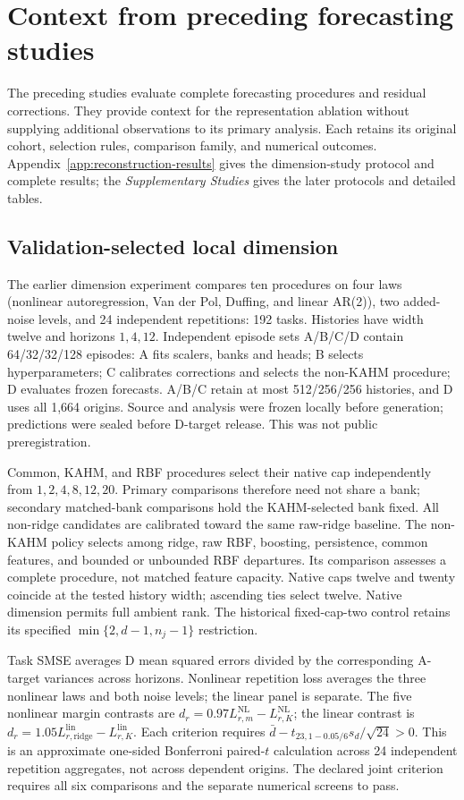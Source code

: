 \section{Context from preceding forecasting studies}
\label{sec:experiment}

The preceding studies evaluate complete forecasting procedures and
residual corrections. They provide context for the representation
ablation without supplying additional observations to its primary
analysis. Each retains its original cohort, selection rules, comparison
family, and numerical outcomes. Appendix~\ref{app:reconstruction-results}
gives the dimension-study protocol and complete results; the
\emph{Supplementary Studies} gives the later protocols and detailed tables.

\subsection{Validation-selected local dimension}

The earlier dimension experiment compares ten procedures on four laws
(nonlinear autoregression, Van der Pol, Duffing, and linear AR(2)), two
added-noise levels, and 24 independent repetitions: 192 tasks. Histories
have width twelve and horizons $1,4,12$. Independent episode sets
A/B/C/D contain 64/32/32/128 episodes: A fits scalers, banks and heads;
B selects hyperparameters; C calibrates corrections and selects the
non-KAHM procedure; D evaluates frozen forecasts. A/B/C retain at most
512/256/256 histories, and D uses all 1,664 origins. Source and analysis
were frozen locally before generation; predictions were sealed before
D-target release. This was not public preregistration.

Common, KAHM, and RBF procedures select their native cap independently
from $1,2,4,8,12,20$. Primary comparisons therefore need not share a bank;
secondary matched-bank comparisons hold the KAHM-selected bank fixed.
All non-ridge candidates are calibrated toward the same raw-ridge
baseline. The non-KAHM policy selects among ridge, raw RBF, boosting,
persistence, common features, and bounded or unbounded RBF departures.
Its comparison assesses a complete procedure, not matched feature capacity.
Native caps twelve and twenty coincide at the tested history width;
ascending ties select twelve. Native dimension permits full ambient rank.
The historical fixed-cap-two control retains its specified
$\min\{2,d-1,n_j-1\}$ restriction.

Task SMSE averages D mean squared errors divided by the corresponding
A-target variances across horizons. Nonlinear repetition loss averages
the three nonlinear laws and both noise levels; the linear panel is
separate. The five nonlinear margin contrasts are
$d_r=0.97L_{r,m}^{\mathrm{NL}}-L_{r,K}^{\mathrm{NL}}$;
the linear contrast is
$d_r=1.05L_{r,\mathrm{ridge}}^{\mathrm{lin}}-L_{r,K}^{\mathrm{lin}}$.
Each criterion requires
$\bar d-t_{23,1-0.05/6}s_d/\sqrt{24}>0$.
This is an approximate one-sided Bonferroni paired-$t$ calculation
across 24 independent repetition aggregates, not across dependent origins.
The declared joint criterion requires all six comparisons and the
separate numerical screens to pass.

